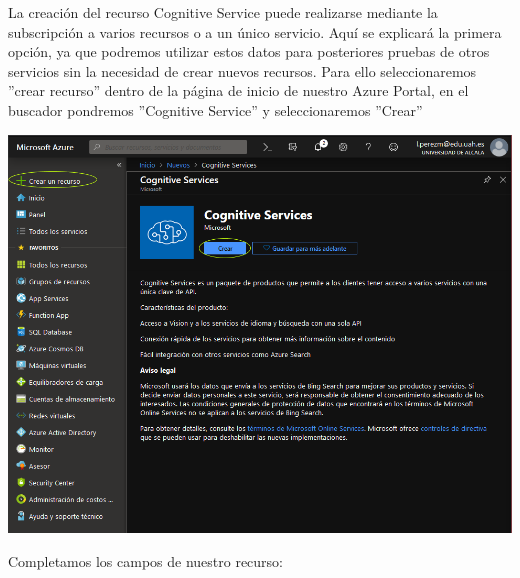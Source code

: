 \documentclass[english,runningheads,a4paper]{llncs}[2018/03/10]
\newenvironment{nscenter}
 {\parskip=0pt\par\nopagebreak\centering}
 {\par\noindent\ignorespacesafterend}
\begin{document}
    La creación del recurso Cognitive Service puede realizarse mediante la 
    subscripción a varios recursos o a un único servicio. Aquí se explicará la 
    primera opción, ya que podremos utilizar estos datos para posteriores 
    pruebas de otros servicios sin la necesidad de crear nuevos recursos. 
    Para ello seleccionaremos ''crear recurso'' dentro de la página de inicio 
    de nuestro Azure Portal, en el buscador pondremos ''Cognitive Service'' y 
    seleccionaremos ''Crear''
    
    \begin{nscenter}
        \includegraphics[scale = 0.25]{./IA/AZURE/crearRecursoCS.png}
    \end{nscenter}
    \newpage Completamos los campos de nuestro recurso:
    
\end{document}
